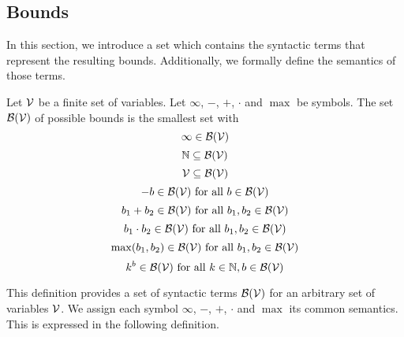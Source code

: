 \subsection{Bounds}

In this section, we introduce a set which contains the syntactic terms that represent the resulting bounds.
Additionally, we formally define the semantics of those terms.

\begin{definition}
  Let $\mathcal{V}$ be a finite set of variables.
  Let $\infty$, $-$, $+$, $\cdot$ and $\max$ be symbols.
  The set $\mathcal{B}(\mathcal{V})$ of possible bounds is the smallest set with
  \[ \infty \in \mathcal{B}(\mathcal{V}) \]
  \[ \mathbb{N} \subseteq \mathcal{B}(\mathcal{V}) \] 
  \[ \mathcal{V} \subseteq \mathcal{B}(\mathcal{V}) \] 
  \[ -b \in \mathcal{B}(\mathcal{V}) \text{ for all } b \in \mathcal{B}(\mathcal{V}) \] 
  \[ b_1 + b_2 \in \mathcal{B}(\mathcal{V}) \text{ for all } b_1, b_2 \in \mathcal{B}(\mathcal{V}) \] 
  \[ b_1 \cdot b_2 \in \mathcal{B}(\mathcal{V}) \text{ for all } b_1, b_2 \in \mathcal{B}(\mathcal{V}) \] 
  \[ \max(b_1, b_2) \in \mathcal{B}(\mathcal{V}) \text{ for all } b_1, b_2 \in \mathcal{B}(\mathcal{V}) \]
  \[ k^b \in \mathcal{B}(\mathcal{V}) \text{ for all } k \in \mathbb{N}, b \in \mathcal{B}(\mathcal{V}) \]
\end{definition}
This definition provides a set of syntactic terms $\mathcal{B}(\mathcal{V})$ for an arbitrary set of variables $\mathcal{V}$.
We assign each symbol $\infty$, $-$, $+$, $\cdot$ and $\max$ its common semantics.
This is expressed in the following definition.

